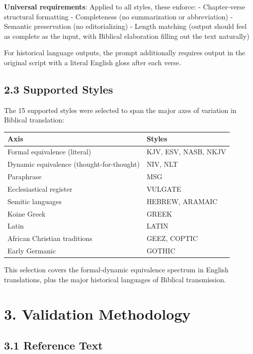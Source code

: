\documentclass[10pt, letterpaper, twocolumn]{article}
\begin{document}
\textbf{Universal requirements}: Applied to all styles, these enforce: - Chapter-verse structural formatting - Completeness (no summarization or abbreviation) - Semantic preservation (no editorializing) - Length matching (output should feel as complete as the input, with Biblical elaboration filling out the text naturally)

For historical language outputs, the prompt additionally requires output in the original script with a literal English gloss after each verse.

\subsection*{2.3 Supported Styles}\label{supported-styles}

The 15 supported styles were selected to span the major axes of variation in Biblical translation:

{\def\LTcaptype{none} %
\begin{tabular}[]{@{}ll@{}}
\toprule\noalign{}
Axis & Styles \\
\midrule\noalign{}
\bottomrule\noalign{}
Formal equivalence (literal) & KJV, ESV, NASB, NKJV \\
Dynamic equivalence (thought-for-thought) & NIV, NLT \\
Paraphrase & MSG \\
Ecclesiastical register & VULGATE \\
Semitic languages & HEBREW, ARAMAIC \\
Koine Greek & GREEK \\
Latin & LATIN \\
African Christian traditions & GEEZ, COPTIC \\
Early Germanic & GOTHIC \\
\end{tabular}
}

This selection covers the formal-dynamic equivalence spectrum in English translations, plus the major historical languages of Biblical transmission.

\section*{3. Validation Methodology}\label{validation-methodology}

\subsection*{3.1 Reference Text}\label{reference-text}
\end{document}
